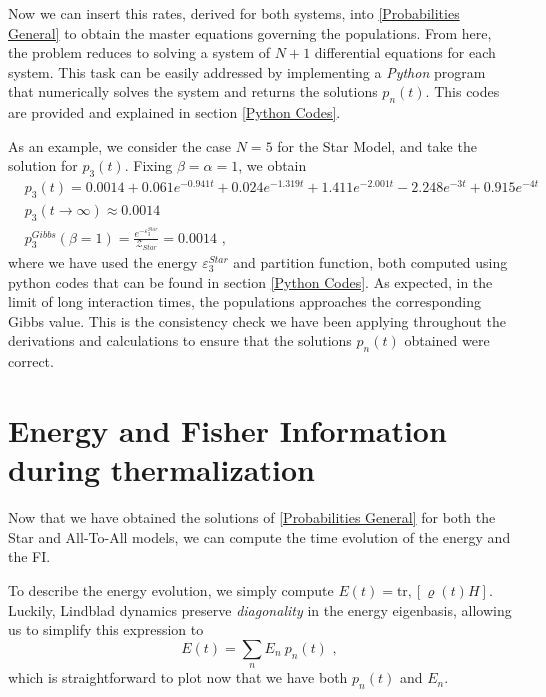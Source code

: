 Now we can insert this rates, derived for both systems, into \eqref{Probabilities General} to obtain the master equations governing the populations. From here, the problem reduces to solving a system of $N+1$ differential equations for each system. This task can be easily addressed by implementing a \textit{Python} program that numerically solves the system and returns the solutions $p_n(t)$. This codes are provided and explained in section \ref{Python Codes}.

As an example, we consider the case $N=5$ for the Star Model, and take the solution for $p_3(t)$. Fixing $\beta=\alpha=1$, we obtain
\begin{align}
    &p_3(t) = 0.0014 + 0.061e^{-0.941t} + 0.024e^{-1.319t} + 1.411 e^{-2.001t} -2.248e^{-3t} + 0.915e^{-4t} \\
    &p_3(t\to\infty)\approx0.0014 \\
    &p_3^{Gibbs}(\beta=1)=\frac{e^{-\varepsilon^{Star}_3}}{\mathcal{Z}_{Star}}=0.0014 \,\,,
\end{align}
where we have used the energy $\varepsilon_3^{Star}$ and partition function, both computed using python codes that can be found in section \ref{Python Codes}. As expected, in the limit of long interaction times, the populations approaches the corresponding Gibbs value. This is the consistency check we have been applying throughout the derivations and calculations to ensure that the solutions $p_n(t)$ obtained were correct.

\section{Energy and Fisher Information during thermalization}
Now that we have obtained the solutions of \eqref{Probabilities General} for both the Star and All-To-All models, we can compute the time evolution of the energy and the FI.

To describe the energy evolution, we simply compute $E(t)=\text{tr},[\varrho(t)H]$. Luckily, Lindblad dynamics preserve \textit{diagonality} in the energy eigenbasis, allowing us to simplify this expression to
\begin{equation}\label{E(t)}
    E(t)=\sum_n E_n\ p_n(t) \,\,,
\end{equation}
which is straightforward to plot now that we have both $p_n(t)$ and $E_n$.

